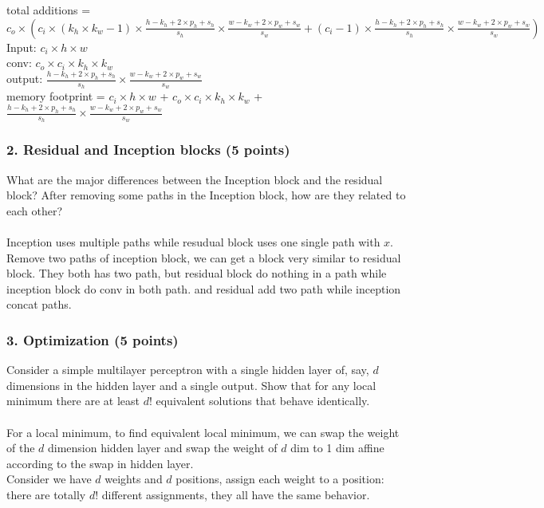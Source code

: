 \documentclass[12pt]{article}%
\begin{document}
total additions = $c_o \times (c_i \times (k_h\times k_w -1) \times \frac{h-k_h+2\times p_h+s_h}{s_h} \times \frac{w-k_w+2\times p_w+s_w}{s_w} + (c_i-1)\times \frac{h-k_h+2\times p_h+s_h}{s_h} \times \frac{w-k_w+2\times p_w+s_w}{s_w})$
\\
Input: $c_i \times h \times w$\\
conv: $c_o \times c_i \times k_h\times k_w$\\
output: $\frac{h-k_h+2\times p_h+s_h}{s_h}\times  \frac{w-k_w+2\times p_w+s_w}{s_w}$\\
memory footprint = $c_i \times h \times w$ + $c_o \times c_i \times k_h\times k_w$ +$\frac{h-k_h+2\times p_h+s_h}{s_h}\times  \frac{w-k_w+2\times p_w+s_w}{s_w}$ 

\newpage

\subsubsection*{2. Residual and Inception blocks (5 points)}
What are the major differences between the Inception block and the residual block? After removing some paths in the Inception block, how are they related to each other?
\\
\\
Inception uses multiple paths while resudual block uses one single path with $x$.
Remove two paths of inception block, we can get a block very similar to residual block.
They both has two path, but residual block do nothing in a path while inception block do conv in both path.
and residual add two path while inception concat paths.
\newpage


\subsubsection*{3. Optimization (5 points)}
Consider a simple multilayer perceptron with a single hidden layer of, say,  $d$  dimensions in the hidden layer and a single output. Show that for any local minimum there are at least  $d!$  equivalent solutions that behave identically.
\\\\
For a local minimum, to find equivalent local minimum, we can swap the weight of the $d$ dimension hidden layer and swap the weight of $d$ dim to 1 dim affine according to the swap in hidden layer.
\\ 
Consider we have $d$ weights and $d$ positions, assign each weight to a position:\\
there are totally $d!$ different assignments, they all have the same behavior.
\end{document}
